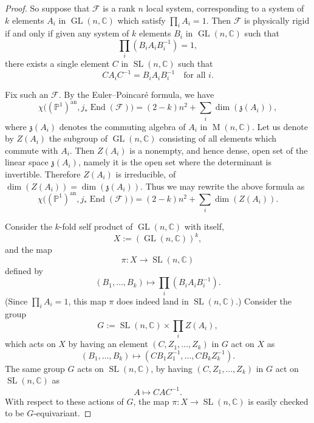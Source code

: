 \begin{proof}
So suppose that \(\mathcal{F}\) is a rank \(n\) local system, corresponding to
a system of \(k\) elements \(A_i\) in \(\operatorname{GL}(n,\mathbb{C})\) which
satisfy \(\prod_i A_i=1\). Then \(\mathcal{F}\) is physically rigid if and only
if given any system of \(k\) elements \(B_i\) in
\(\operatorname{GL}(n,\mathbb{C})\) such that
\[
  \prod_i (B_iA_iB_i^{-1})=1,
\]
there exists a single element \(C\) in \(\operatorname{SL}(n,\mathbb{C})\) such
that
\[
  CA_iC^{-1}=B_iA_iB_i^{-1}\quad\text{for all }i.
\]

Fix such an \(\mathcal{F}\). By the Euler--Poincaré formula, we have
\[
  \chi\bigl((\mathbb{P}^1)^{\mathrm{an}},j_*\operatorname{End}(\mathcal{F})\bigr)
  =
  (2-k)n^2+\sum_i\dim(\mathfrak{z}(A_i)),
\]
where \(\mathfrak{z}(A_i)\) denotes the commuting algebra of \(A_i\) in
\(\operatorname{M}(n,\mathbb{C})\). Let us denote by \(Z(A_i)\) the subgroup of
\(\operatorname{GL}(n,\mathbb{C})\) consisting of all elements which commute
with \(A_i\). Then \(Z(A_i)\) is a nonempty, and hence dense, open set of the
linear space \(\mathfrak{z}(A_i)\), namely it is the open set where the
determinant is invertible. Therefore \(Z(A_i)\) is irreducible, of
\(\dim(Z(A_i))=\dim(\mathfrak{z}(A_i))\). Thus we may rewrite the above formula
as
\[
  \chi\bigl((\mathbb{P}^1)^{\mathrm{an}},j_*\operatorname{End}(\mathcal{F})\bigr)
  =
  (2-k)n^2+\sum_i\dim(Z(A_i)).
\]

Consider the \(k\)-fold self product of \(\operatorname{GL}(n,\mathbb{C})\) with
itself,
\[
  X:=(\operatorname{GL}(n,\mathbb{C}))^k,
\]
and the map
\[
  \pi:X\to\operatorname{SL}(n,\mathbb{C})
\]
defined by
\[
  (B_1,\ldots,B_k)\mapsto\prod_i(B_iA_iB_i^{-1}).
\]
(Since \(\prod_i A_i=1\), this map \(\pi\) does indeed land in
\(\operatorname{SL}(n,\mathbb{C})\).) Consider the group
\[
  G:=\operatorname{SL}(n,\mathbb{C})\times\prod_i Z(A_i),
\]
which acts on \(X\) by having an element \((C,Z_1,\ldots,Z_k)\) in \(G\) act on
\(X\) as
\[
  (B_1,\ldots,B_k)\mapsto(CB_1Z_1^{-1},\ldots,CB_kZ_k^{-1}).
\]
The same group \(G\) acts on \(\operatorname{SL}(n,\mathbb{C})\), by having
\((C,Z_1,\ldots,Z_k)\) in \(G\) act on \(\operatorname{SL}(n,\mathbb{C})\) as
\[
  A\mapsto CAC^{-1}.
\]
With respect to these actions of \(G\), the map
\(\pi:X\to\operatorname{SL}(n,\mathbb{C})\) is easily checked to be
\(G\)-equivariant.


\end{proof}
